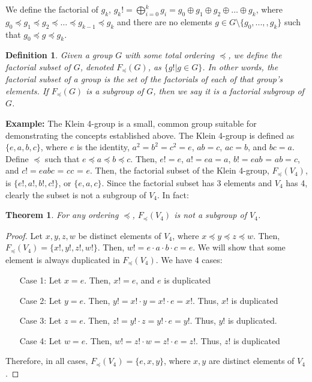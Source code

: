 \documentclass{article}
\newtheorem{theorem}{Theorem}
\newtheorem{definition}{Definition}
\begin{document}
We define the factorial of $g_k$, $g_k! = \bigoplus_{i=0}^{k} g_i = g_0 \oplus g_1 \oplus g_2 \oplus \ldots \oplus g_k$, where $g_0\preceq g_1\preceq g_2 \preceq \ldots \preceq g_{k-1} \preceq g_k$ and there are no elements $g\in G\setminus\{g_0,...,,g_k\}$ such that $g_0\preceq g\preceq g_k$.
\begin{definition}
Given a group $G$ with some total ordering $\preceq$, we define the \textit{factorial subset} of $G$, denoted $F_\preceq(G)$, as $\{g! | g \in G\}$. In other words, the factorial subset of a group is the set of the factorials of each of that group's elements. If $F_\preceq(G)$ is a subgroup of $G$, then we say it is a \textit{factorial subgroup} of $G$. 
\end{definition}

\textbf{Example:} The Klein 4-group is a small, common group suitable for demonstrating the concepts established above. The Klein 4-group is defined as $\{e,a,b,c\}$, where $e$ is the identity, $a^2 = b^2 = c^2 = e$, $ab = c$, $ac = b$, and
$bc = a$. Define $\preceq$ such that $e\preceq a \preceq b \preceq c$. Then, $e! = e$, $a! = ea = a$, $b! = eab$ = $ab = c$, and $c! = eabc$ = $cc$ = $e$. Then, the factorial subset of the Klein 4-group, $F_\preceq(V_4)$, is $\{e!,a!,b!,c!\}$, or $\{e,a,c\}$. Since the factorial subset has 3 elements and $V_4$ has 4, clearly the subset is not a subgroup of $V_4$. In fact:
\begin{theorem}
For any ordering $\preceq$, $F_\preceq(V_4)$ is not a subgroup of $V_4$.
\end{theorem}
\begin{proof}
Let $x,y,z,w$ be distinct elements of $V_4$, where $x\preceq y \preceq z \preceq w$. Then, $F_\preceq(V_4) = \{x!,y!,z!,w!\}$. Then, $w! = e\cdot a\cdot b\cdot c = e$. We will show that some element is always duplicated in $F_\preceq(V_4)$. We have 4 cases:
\begin{itemize}
    \item[Case 1:] Let $x=e$. Then, $x! = e$, and $e$ is duplicated
    \item[Case 2:] Let $y=e$. Then, $y! = x!\cdot y = x!\cdot e = x!$. Thus, $x!$ is duplicated
    \item[Case 3:] Let $z=e$. Then, $z! = y!\cdot z = y!\cdot e = y!$. Thus, $y!$ is duplicated.
    \item[Case 4:] Let $w=e$. Then, $w! = z! \cdot w = z!\cdot e = z!$. Thus, $z!$ is duplicated
\end{itemize}
Therefore, in all cases, $F_\preceq(V_4) = \{e,x,y\}$, where $x,y$ are distinct elements of $V_4$. 
\end{proof}
\end{document}
